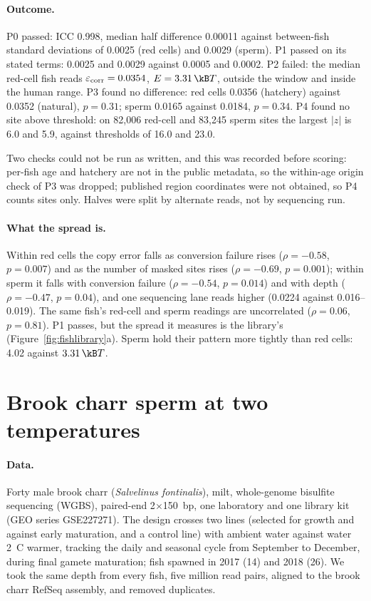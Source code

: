\paragraph{Outcome.} P0 passed: ICC 0.998, median half difference 0.00011 against between-fish standard deviations of 0.0025 (red
cells) and 0.0029 (sperm). P1 passed on its stated terms: 0.0025 and 0.0029 against 0.0005 and 0.0002. P2 failed: the median
red-cell fish reads $\varepsilon_{\rm corr}=0.0354$, $E=3.31\,\kB T$, outside the window and inside the human range. P3 found no
difference: red cells 0.0356 (hatchery) against 0.0352 (natural), $p=0.31$; sperm 0.0165 against 0.0184, $p=0.34$. P4 found no
site above threshold: on 82,006 red-cell and 83,245 sperm sites the largest $|z|$ is 6.0 and 5.9, against thresholds of 16.0 and
23.0. \measured

Two checks could not be run as written, and this was recorded before scoring: per-fish age and hatchery are not in the public
metadata, so the within-age origin check of P3 was dropped; published region coordinates were not obtained, so P4 counts sites
only. Halves were split by alternate reads, not by sequencing run.

\paragraph{What the spread is.} Within red cells the copy error falls as conversion failure rises ($\rho=-0.58$, $p=0.007$) and
as the number of masked sites rises ($\rho=-0.69$, $p=0.001$); within sperm it falls with conversion failure ($\rho=-0.54$,
$p=0.014$) and with depth ($\rho=-0.47$, $p=0.04$), and one sequencing lane reads higher (0.0224 against 0.016--0.019). The same
fish's red-cell and sperm readings are uncorrelated ($\rho=0.06$, $p=0.81$). P1 passes, but the spread it measures is the
library's (Figure~\ref{fig:fishlibrary}a). Sperm hold their pattern more tightly than red cells: 4.02 against $3.31\,\kB T$.
\measured

\section{Brook charr sperm at two temperatures}

\paragraph{Data.} Forty male brook charr (\emph{Salvelinus fontinalis}), milt, whole-genome bisulfite sequencing (WGBS),
paired-end 2$\times$150~bp, one laboratory and one library kit (GEO series GSE227271). The design crosses two lines (selected for
growth and against early maturation, and a control line) with ambient water against water 2~\textdegree C warmer, tracking the
daily and seasonal cycle from September to December, during final gamete maturation; fish spawned in 2017 (14) and 2018 (26). We
took the same depth from every fish, five million read pairs, aligned to the brook charr RefSeq assembly, and removed duplicates.

